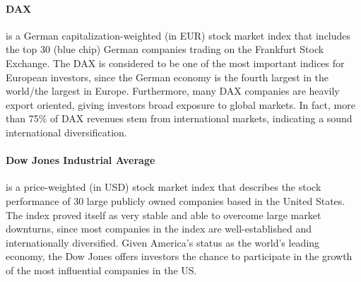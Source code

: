 \documentclass[11pt, parskip=full, DIV=14]{scrreprt}
\begin{document}
\begin{figure}
  \centering
\end{figure}
%
\paragraph{DAX} is a German capitalization-weighted (in EUR) stock market index that includes the top 30 (blue chip) German companies trading on the Frankfurt Stock Exchange.
The DAX is considered to be one of the most important indices for European investors, since the German economy is the fourth largest in the world/the largest in Europe.
Furthermore, many DAX companies are heavily export oriented, giving investors broad exposure to global markets. In fact, more than 75\% of DAX revenues stem from international markets, indicating a sound international diversification.

\begin{figure}
  \centering
\end{figure}
%
\paragraph{Dow Jones Industrial Average} is a price-weighted (in USD) stock market index that describes the stock performance of 30 large publicly owned companies based in the United States.
The index proved itself as very stable and able to overcome large market downturns, since most companies in the index are well-established and internationally diversified.
Given America's status as the world's leading economy, the Dow Jones offers investors the chance to participate in the growth of the most influential companies in the US.

\begin{figure}
  \centering
\end{figure}
%
\end{document}
